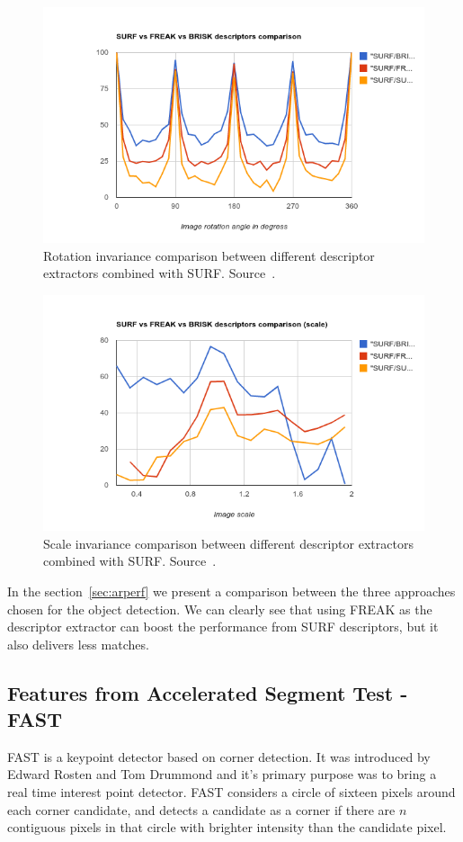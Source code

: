 \begin{figure}
\centering
\includegraphics[scale=0.75]{img/rotation.png}
\caption{\label{fig:surfrotation} Rotation invariance comparison between different descriptor
  extractors combined with SURF. Source~\cite{rotationscaleinv}.}
\end{figure} 

\begin{figure}
\centering
\includegraphics[scale=0.75]{img/scale.png}
\caption{\label{fig:surfscale}Scale invariance comparison between different descriptor
  extractors combined with SURF. Source~\cite{rotationscaleinv}.}
\end{figure} 

In the section~\ref{sec:arperf} we present a comparison between the three
approaches chosen for the object detection. We can clearly see that using FREAK
as the descriptor extractor can boost the performance from SURF descriptors,
but it also delivers less matches.

\subsection{Features from Accelerated Segment Test - FAST}
FAST is a keypoint detector based on corner detection. It was introduced by
Edward Rosten and Tom Drummond\cite{Rosten:2006:MLH:2094437.2094478} and it's primary purpose was to bring a real
time interest point detector. FAST considers a circle of sixteen pixels around
each corner candidate, and detects a candidate as a corner if there are $n$
contiguous pixels in that circle with brighter intensity than the candidate
pixel. %

